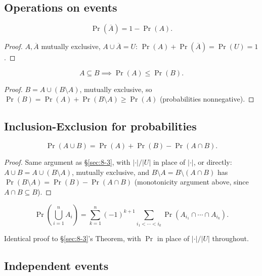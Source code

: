 \documentclass[11pt]{article}
\begin{document}
\subsection{Operations on events}
\label{sec:9-5}

\begin{theorem}[Complement]
\[
\Pr(\overline{A}) = 1-\Pr(A).
\]
\end{theorem}
\begin{proof}
$A,\overline{A}$ mutually exclusive, $A\cup\overline{A}=U$: $\Pr(A)+\Pr(\overline{A})=\Pr(U)=1$.
\end{proof}

\begin{theorem}[Monotonicity]
\[
A\subseteq B \implies \Pr(A)\le\Pr(B).
\]
\end{theorem}
\begin{proof}
$B = A\cup(B\setminus A)$, mutually exclusive, so $\Pr(B)=\Pr(A)+\Pr(B\setminus A)\ge\Pr(A)$ (probabilities nonnegative).
\end{proof}

\subsection{Inclusion-Exclusion for probabilities}
\label{sec:9-6}

\begin{theorem}
\[
\Pr(A\cup B) = \Pr(A)+\Pr(B)-\Pr(A\cap B).
\]
\end{theorem}
\begin{proof}
Same argument as \S\ref{sec:8-3}, with $|\cdot|/|U|$ in place of $|\cdot|$, or directly: $A\cup B = A\cup(B\setminus A)$, mutually exclusive, and $B\setminus A = B\setminus(A\cap B)$ has $\Pr(B\setminus A)=\Pr(B)-\Pr(A\cap B)$ (monotonicity argument above, since $A\cap B\subseteq B$).
\end{proof}

\begin{theorem}
\[
\Pr\left(\bigcup_{i=1}^n A_i\right) = \sum_{k=1}^n (-1)^{k+1}\sum_{i_1<\cdots<i_k} \Pr(A_{i_1}\cap\cdots\cap A_{i_k}).
\]
\end{theorem}
\begin{note}
Identical proof to \S\ref{sec:8-3}'s Theorem, with $\Pr$ in place of $|\cdot|/|U|$ throughout.
\end{note}

\subsection{Independent events}
\label{sec:9-7}
\end{document}

